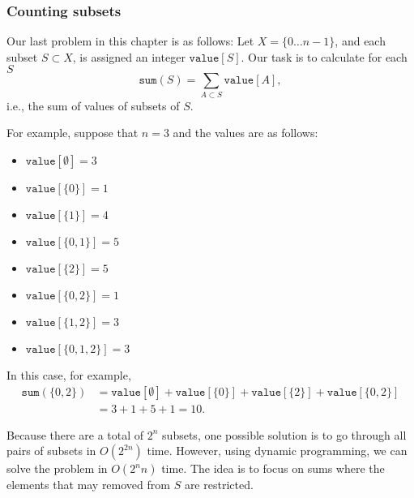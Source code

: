 \subsubsection{Counting subsets}

Our last problem in this chapter is as follows:
Let $X=\{0 \ldots n-1\}$, and each subset $S \subset X$,
is assigned an integer $\texttt{value}[S]$.
Our task is to calculate for each $S$
\[\texttt{sum}(S) = \sum_{A \subset S} \texttt{value}[A],\]
i.e., the sum of values of subsets of $S$.

For example, suppose that $n=3$ and the values are as follows:
\begin{multicols}{2}
\begin{itemize}
\item $\texttt{value}[\emptyset] = 3$
\item $\texttt{value}[\{0\}] = 1$
\item $\texttt{value}[\{1\}] = 4$
\item $\texttt{value}[\{0,1\}] = 5$
\item $\texttt{value}[\{2\}] = 5$
\item $\texttt{value}[\{0,2\}] = 1$
\item $\texttt{value}[\{1,2\}] = 3$
\item $\texttt{value}[\{0,1,2\}] = 3$
\end{itemize}
\end{multicols}
In this case, for example,
\begin{equation*}
\begin{split}
\texttt{sum}(\{0,2\}) &= \texttt{value}[\emptyset]+\texttt{value}[\{0\}]+\texttt{value}[\{2\}]+\texttt{value}[\{0,2\}] \\ 
                      &= 3 + 1 + 5 + 1 = 10.
\end{split}
\end{equation*}

Because there are a total of $2^n$ subsets,
one possible solution is to go through all
pairs of subsets in $O(2^{2n})$ time.
However, using dynamic programming, we
can solve the problem in $O(2^n n)$ time.
The idea is to focus on sums where the
elements that may removed from $S$ are restricted.

